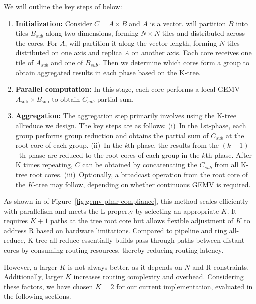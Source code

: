 We will outline the key steps of \gemm below:

\begin{enumerate}[label=(\arabic*), leftmargin=0.5cm, noitemsep,topsep=0pt]
\item \textbf{Initialization:} Consider $C = A \times B$ and $A$ is a vector. \gemv will partition $B$ into tiles $B_{sub}$ along two dimensions, forming $N \times N$ tiles and distributed across the cores. For $A$, \gemv will partition it along the vector length, forming $N$ tiles distributed on one axis and replica $A$ on another axis. Each core receives one tile of $A_{sub}$ and one of $B_{sub}$. Then we determine which cores form a group to obtain aggregated results in each phase based on the K-tree.

\item \textbf{Parallel computation:} In this stage, each core performs a local GEMV $A_{\text{sub}} \times B_{\text{sub}}$ to obtain $C_{sub}$ partial sum.

\item \textbf{Aggregation:} The aggregation step primarily involves using the K-tree allreduce we design. The key steps are as follows: (i)~In the 1st-phase, each group performs group reduction and obtains the partial sum of $C_{sub}$ at the root core of each group. (ii)~In the $k$th-phase, the results from the $(k-1)$~th-phase are reduced to the root cores of each group in the $k$th-phase. After K times repeating, $C$ can be obtained by concatenating the $C_{sub}$ from all K-tree root cores. (iii)~Optionally, a broadcast operation from the root core of the $K$-tree may follow, depending on whether continuous GEMV is required.
\end{enumerate}

As shown in  of Figure~\ref{fig:gemv-plmr-compliance}, this method scales efficiently with parallelism and meets the L property by selecting an appropriate $K$. It requires $K+1$ paths at the tree root core but allows flexible adjustment of $K$ to address R based on hardware limitations. Compared to pipeline and ring all-reduce, K-tree all-reduce essentially builds pass-through paths between distant cores by consuming routing resources, thereby reducing routing latency.

However, a larger $K$ is not always better, as it depends on $N$ and R constraints. Additionally, larger $K$ increases routing complexity and overhead. Considering these factors, we have chosen $K=2$ for our current implementation, evaluated in the following sections.
